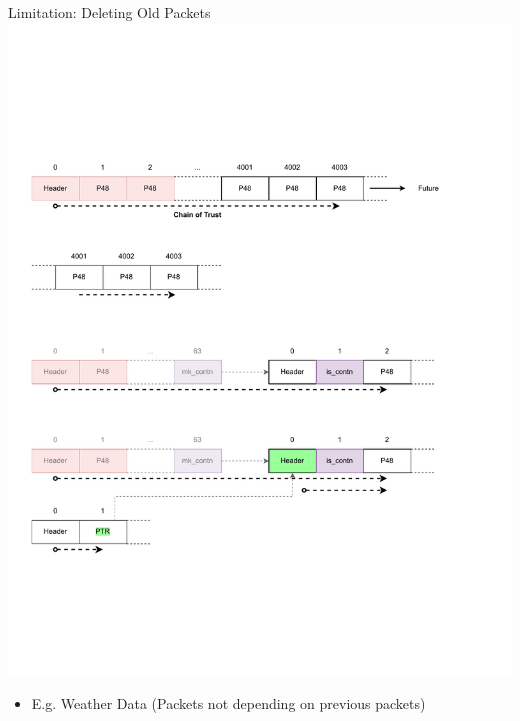 \documentclass[aspectratio=169]{beamer}
\begin{document}
\begin{frame}[c]{Limitation: Deleting Old Packets}
\includegraphics[width=1\textwidth]{images/session_1.pdf}
\begin{itemize}
	\item E.g. Weather Data (Packets not depending on previous packets)
\end{itemize}
\end{frame}
\end{document}
